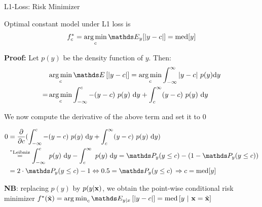 \documentclass[11pt,compress,t,notes=noshow, xcolor=table]{beamer}
\begin{document}

\begin{framev}[fs=footnotesize]{L1-Loss: Risk Minimizer}

Optimal constant model under L1 loss is
$$f_{c}^{\ast} = \argmin_c \E_y[|y-c|] =  \text{med} [y]$$

\textbf{Proof:} Let $p(y)$ be the density function of $y$. Then: 
\begin{align*}
&\argmin_c \E\left[|y - c|\right] = \argmin_c \int_{-\infty}^\infty |y - c| ~ p(y) \text{d}y \\
=& \argmin_c \int_{-\infty}^c -(y - c)~p(y)~\text{d}y + \int_c^\infty (y - c)~p(y)~\text{d}y 
\end{align*}

We now compute the derivative of the above term and set it to $0$

\begin{align*}
0 &= \frac{\partial}{\partial c} (\int_{-\infty}^c -(y - c)~p(y)~\text{d}y + \int_c^\infty (y - c)~p(y)~\text{d}y) \\ &\overset{^\ast\text{Leibniz}}{=} \int_{-\infty}^c  ~p(y)~\text{d}y - \int_c^\infty ~p(y)~\text{d}y =   \P_y (y \le c) - (1 - \P_y (y \le c)) \\
&= 2 \cdot \P_y (y \le c) - 1 \Leftrightarrow 0.5 = \P_y (y \le c) \,\Rightarrow c = \text{med}[y]
\end{align*}

\textbf{NB}: replacing $p(y)$ by $p(y|\mathbf{x})$, we obtain the point-wise conditional risk minimizer
$f^{\ast}(\xtil) = \argmin_c \E_{y|x}\left[|y - c|\right]= \text{med}\left[y ~|~ \xv = \xtil \right]$

\end{framev}
\end{document}

